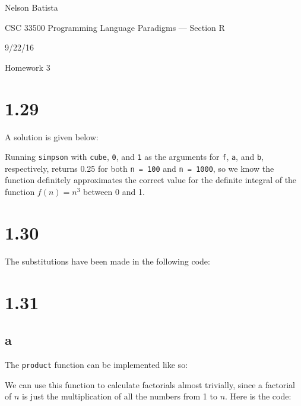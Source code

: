 \documentclass{article}
\begin{document}
Nelson Batista

CSC 33500 Programming Language Paradigms --- Section R

9/22/16

Homework 3

\section*{1.29}

A solution is given below:

\lstset{basicstyle=\ttfamily}


Running \texttt{simpson} with \texttt{cube}, \texttt{0}, and \texttt{1} as the arguments for \texttt{f}, \texttt{a}, and \texttt{b}, respectively, returns 0.25 for both \texttt{n = 100} and \texttt{n = 1000}, so we know the function definitely approximates the correct value for the definite integral of the function $f(n) = n^3$ between 0 and 1.

\section*{1.30}

The substitutions have been made in the following code:



\section*{1.31}

\subsection*{a}

The \texttt{product} function can be implemented like so:



We can use this function to calculate factorials almost trivially, since a factorial of $n$ is just the multiplication of all the numbers from 1 to $n$. Here is the code:


\end{document}
